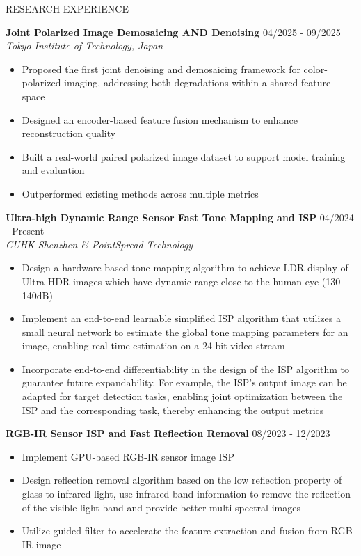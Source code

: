 \documentclass{resume} %
\begin{document}
\begin{rSection}{RESEARCH EXPERIENCE}

\setlength{\parskip}{1.5pt}

\textbf{Joint Polarized Image Demosaicing AND Denoising} \hfill 04/2025 - 09/2025\\
\textit{Tokyo Institute of Technology, Japan}
\begin{itemize}
    \setlength{\itemsep}{0pt}
    \setlength{\parsep}{0pt}
    \setlength{\parskip}{0pt}
    \item Proposed the first joint denoising and demosaicing framework for color-polarized imaging, addressing both degradations within a shared feature space
    \item Designed an encoder-based feature fusion mechanism to enhance reconstruction quality
    \item Built a real-world paired polarized image dataset to support model training and evaluation
    \item Outperformed existing methods across multiple metrics
\end{itemize}

\textbf{Ultra-high Dynamic Range Sensor Fast Tone Mapping and ISP} \hfill 04/2024 - Present\\
\textit{CUHK-Shenzhen \& PointSpread Technology}
\begin{itemize}
    \setlength{\itemsep}{0pt}
    \setlength{\parsep}{0pt}
    \setlength{\parskip}{0pt}
    \item Design a hardware-based tone mapping algorithm to achieve LDR display of Ultra-HDR images which have dynamic range close to the human eye (130-140dB)
    \item Implement an end-to-end learnable simplified ISP algorithm that utilizes a small neural network to estimate the global tone mapping parameters for an image, enabling real-time estimation on a 24-bit video stream
    \item Incorporate end-to-end differentiability in the design of the ISP algorithm to guarantee future expandability. For example, the ISP's output image can be adapted for target detection tasks, enabling joint optimization between the ISP and the corresponding task, thereby enhancing the output metrics
\end{itemize}

\textbf{RGB-IR Sensor ISP and Fast Reflection Removal} \hfill 08/2023 - 12/2023
\begin{itemize}
    \setlength{\itemsep}{0pt}
    \setlength{\parsep}{0pt}
    \setlength{\parskip}{0pt}
    \item Implement GPU-based RGB-IR sensor image ISP
    \item Design reflection removal algorithm based on the low reflection property of glass to infrared light, use infrared band information to remove the reflection of the visible light band and provide better multi-spectral images
    \item Utilize guided filter to accelerate the feature extraction and fusion from RGB-IR image
\end{itemize}

\end{rSection} 
\end{document}
